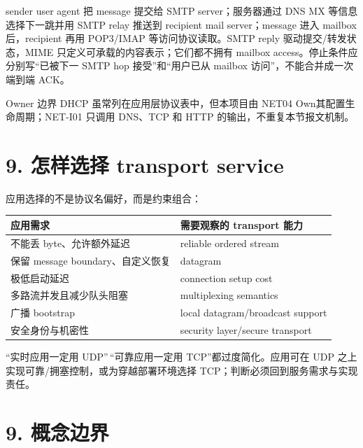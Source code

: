 \documentclass[UTF8,fontset=none,11pt,a4paper]{ctexart}
\begin{document}
sender user agent 把 message 提交给 SMTP server；服务器通过 DNS MX 等信息选择下一跳并用 SMTP relay 推送到 recipient mail server；message 进入 mailbox 后，recipient 再用 POP3/IMAP 等访问协议读取。SMTP reply 驱动提交/转发状态，MIME 只定义可承载的内容表示；它们都不拥有 mailbox access。停止条件应分别写“已被下一 SMTP hop 接受”和“用户已从 mailbox 访问”，不能合并成一次端到端 ACK。

\begin{warnbox}{Owner 边界}
DHCP 虽常列在应用层协议表中，但本项目由 NET04 Own其配置生命周期；NET-I01 只调用 DNS、TCP 和 HTTP 的输出，不重复本节报文机制。
\end{warnbox}

\section{9. 怎样选择 transport
service}\label{8-ux600eux6837ux9009ux62e9-transport-service}

应用选择的不是协议名偏好，而是约束组合：

\begin{longtable}[]{@{}ll@{}}
\toprule\noalign{}
应用需求 & 需要观察的 transport 能力 \\
\midrule\noalign{}
\endhead
\bottomrule\noalign{}
\endlastfoot
不能丢 byte、允许额外延迟 & reliable ordered stream \\
保留 message boundary、自定义恢复 & datagram \\
极低启动延迟 & connection setup cost \\
多路流并发且减少队头阻塞 & multiplexing semantics \\
广播 bootstrap & local datagram/broadcast support \\
安全身份与机密性 & security layer/secure transport \\
\end{longtable}

``实时应用一定用 UDP''\,``可靠应用一定用 TCP''都过度简化。应用可在 UDP
之上实现可靠/拥塞控制，或为穿越部署环境选择
TCP；判断必须回到服务需求与实现责任。

\section{9. 概念边界}\label{9-ux6982ux5ff5ux8fb9ux754c}
\end{document}
